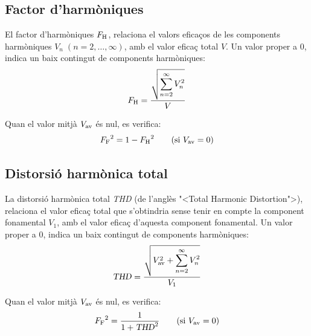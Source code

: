 \subsection{Factor d'harm\`{o}niques}
 

El factor d'harm\`{o}niques $F_\mathrm{H}$, relaciona el valors efica\c{c}os de
les components harm\`{o}niques $V_n \;(n=2,\ldots,\infty)$, amb el valor
efica\c{c} total $V$. Un valor proper a 0, indica un baix contingut de
components harm\`{o}niques:
\begin{equation}
    F_\mathrm{H} = \frac{\sqrt{\displaystyle\sum_{n=2}^\infty V^2_n}}{V}
\end{equation}

Quan el valor mitj\`{a} $V_\mathrm{av}$ \'{e}s nul, es verifica:
\begin{equation}
    {F\ensuremath{_\mathrm{F}}}^2 = 1 - {F_\mathrm{H}}^2 \qquad\text{(si } V_\mathrm{av}=0\text{)}
\end{equation}

\subsection{Distorsi\'{o} harm\`{o}nica total} 

 La distorsi\'{o} harm\`{o}nica total \textsl{THD} (de l'angl\`{e}s {"<}Total
Harmonic Distortion{">}), relaciona el valor efica\c{c} total que
s'obtindria sense tenir en compte  la component fonamental $V_1$,
amb el valor efica\c{c} d'aquesta component fonamental. Un valor proper
a 0, indica un baix contingut de components harm\`{o}niques:
\begin{equation}
    \text{\textsl{THD}} = \frac{\sqrt{V_\mathrm{av}^2+
    \displaystyle\sum_{n=2}^\infty V^2_n}} {V_1}
\end{equation}

Quan el valor mitj\`{a} $V_\mathrm{av}$ \'{e}s nul, es verifica:
\begin{equation}
    {F\ensuremath{_\mathrm{F}}}^2 = \frac{1}{1+\text{\textsl{THD}}^2} \qquad\text{(si } V_\mathrm{av}=0\text{)}
\end{equation}


